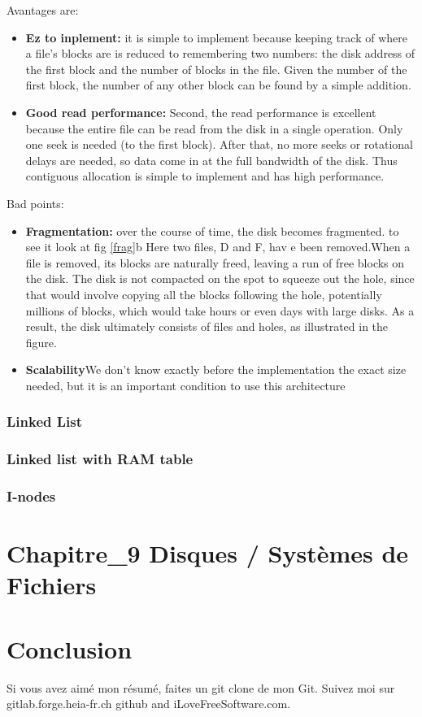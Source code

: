 Avantages are:
\begin{itemize}
    \item \textbf{Ez to inplement: } it is simple to implement because keeping track of where a file’s blocks are is reduced to remembering two numbers: the disk address of the first block and the number of blocks in the file. Given the number of the first block, the number of any other block can be found by a simple addition.
    \item \textbf{Good read performance: }Second, the read performance is excellent because the entire file can be read
    from the disk in a single operation. Only one seek is needed (to the first block).
    After that, no more seeks or rotational delays are needed, so data come in at the
    full bandwidth of the disk. Thus contiguous allocation is simple to implement and
    has high performance.
\end{itemize}
Bad points:
\begin{itemize}
    \item \textbf{Fragmentation: }over the course of time, the disk becomes fragmented. to see it look at fig \ref{frag}b Here two files, D and F, hav e been removed.When a file is removed,
    its blocks are naturally freed, leaving a run of free blocks on the disk. The
    disk is not compacted on the spot to squeeze out the hole, since that would involve
    copying all the blocks following the hole, potentially millions of blocks, which
    would take hours or even days with large disks. As a result, the disk ultimately
    consists of files and holes, as illustrated in the figure.
    \item \textbf{Scalability}We don't know exactly before the implementation the exact size needed, but it is an important condition to use this architecture
\end{itemize}

\subsubsection{Linked List}

\subsubsection{Linked list with RAM table}

\subsubsection{I-nodes}

\newpage
\section{Chapitre\_9 Disques / Systèmes de Fichiers}

\newpage
\section{Conclusion}
Si vous avez aimé mon résumé, faites un git clone de mon Git. Suivez moi sur gitlab.forge.heia-fr.ch github and iLoveFreeSoftware.com.


